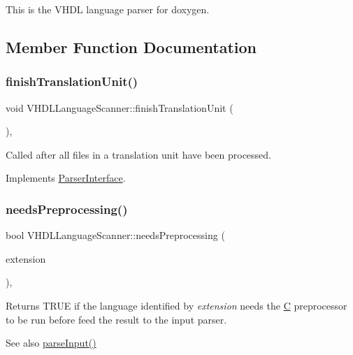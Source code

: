 This is the V\+H\+DL language parser for doxygen. 

\subsection{Member Function Documentation}
\mbox{\label{class_v_h_d_l_language_scanner_a1c08cc94a1cd79fdaf8a102935089445}} 
\subsubsection{\texorpdfstring{finishTranslationUnit()}{finishTranslationUnit()}}
{\footnotesize\ttfamily void V\+H\+D\+L\+Language\+Scanner\+::finish\+Translation\+Unit (\begin{DoxyParamCaption}{ }\end{DoxyParamCaption})\hspace{0.3cm}{\ttfamily [inline]}, {\ttfamily [virtual]}}

Called after all files in a translation unit have been processed. 

Implements \mbox{\hyperlink{class_parser_interface_af3acd64c6a33852e2e46e7288eb9c9cf}{Parser\+Interface}}.

\mbox{\label{class_v_h_d_l_language_scanner_ae36ed4aad0a9dc9beed5afa3e831a5ee}} 
\subsubsection{\texorpdfstring{needsPreprocessing()}{needsPreprocessing()}}
{\footnotesize\ttfamily bool V\+H\+D\+L\+Language\+Scanner\+::needs\+Preprocessing (\begin{DoxyParamCaption}\item[{const \mbox{\hyperlink{class_q_c_string}{Q\+C\+String}} \&}]{extension }\end{DoxyParamCaption})\hspace{0.3cm}{\ttfamily [inline]}, {\ttfamily [virtual]}}

Returns T\+R\+UE if the language identified by {\itshape extension} needs the \mbox{\hyperlink{class_c}{C}} preprocessor to be run before feed the result to the input parser. \begin{DoxySeeAlso}{See also}
\mbox{\hyperlink{class_v_h_d_l_language_scanner_a604cae09257525fbca32c10ffeb6e961}{parse\+Input()}} 
\end{DoxySeeAlso}


